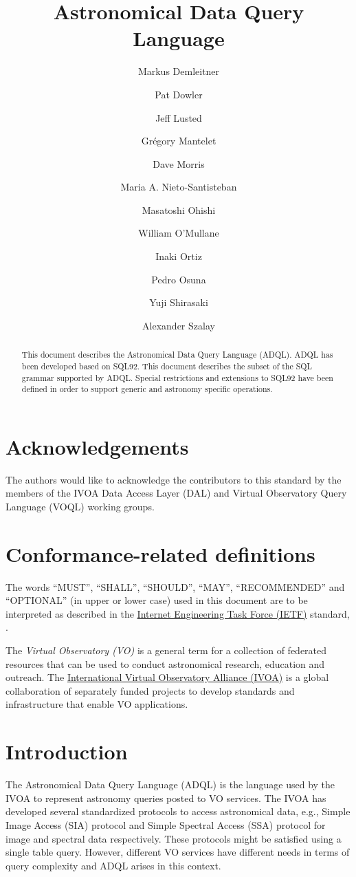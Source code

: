 \documentclass[11pt,a4paper]{ivoa}
\title{Astronomical Data Query Language}
\author{Markus Demleitner}
\author{Pat Dowler}
\author{Jeff Lusted}
\author{Grégory Mantelet}
\author{Dave Morris}
\author{Maria A. Nieto-Santisteban}
\author{Masatoshi Ohishi}
\author{William O’Mullane}
\author{Inaki Ortiz}
\author{Pedro Osuna}
\author{Yuji Shirasaki}
\author{Alexander Szalay}
\begin{document}
\begin{abstract}
This document describes the Astronomical Data Query Language (ADQL).
ADQL has been developed based on SQL92.
This document describes the subset of the SQL grammar supported by ADQL.
Special restrictions and extensions to SQL92 have been defined in order
to support generic and astronomy specific operations.
\end{abstract}

\section*{Acknowledgements}

The authors would like to acknowledge the contributors to this standard by
the members of the IVOA Data Access Layer (DAL) and Virtual Observatory
Query Language (VOQL) working groups.

\section*{Conformance-related definitions}

The words ``MUST'', ``SHALL'', ``SHOULD'', ``MAY'', ``RECOMMENDED'' and
``OPTIONAL'' (in upper or lower case) used in this document are to be
interpreted as described in the
\href{https://www.ietf.org/}{Internet Engineering Task Force (IETF)}
standard, \citet{std:RFC2119}.

The \emph{Virtual Observatory (VO)} is a general term for a collection of
federated resources that can be used to conduct astronomical research,
education and outreach. The
\href{http://www.ivoa.net}{International Virtual Observatory Alliance (IVOA)}
is a global collaboration of separately funded
projects to develop standards and infrastructure that enable VO applications.

\clearpage %
\section{Introduction}
\label{sec:introduction}

The Astronomical Data Query Language (ADQL) is the language used by the
IVOA to represent astronomy queries posted to VO services.
The IVOA has developed several standardized protocols to access astronomical
data, e.g., Simple Image Access (SIA) protocol and Simple Spectral Access (SSA)
protocol for image and spectral data respectively.
These protocols might be satisfied using a single
table query. However, different VO services have different needs in terms
of query complexity and ADQL arises in this context.
\end{document}

